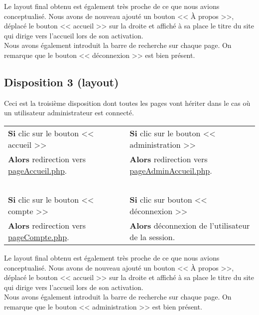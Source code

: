 
        \begin{paragraphe}
            Le layout final obtenu est également très proche de ce que nous avions conceptualisé. Nous avons de nouveau ajouté un bouton << À propos >>,
            déplacé le bouton << accueil >> sur la droite et affiché à sa place le titre du site qui dirige vers l'accueil lors de son activation.\\
            Nous avons également introduit la barre de recherche sur chaque page. On remarque que le bouton << déconnexion >> est bien présent.
        \end{paragraphe}


	\newpage

	\subsection{Disposition 3 (layout)}

		\begin{paragraphe}
            Ceci est la troisième disposition dont toutes les pages vont hériter dans le cas où un utilisateur administrateur est connecté.
		\end{paragraphe}

        \begin{center}
            \begin{tabular}{l c | c l}
                \textbf{Si} clic sur le bouton << accueil >> & & & \textbf{Si} clic sur le bouton << administration >> \\
                \textbf{Alors} redirection vers \underline{pageAccueil.php}. & & & \textbf{Alors} redirection vers \underline{pageAdminAccueil.php}. \\ \\
                \textbf{Si} clic sur le bouton << compte >> & & & \textbf{Si} clic sur bouton << déconnexion >> \\
                \textbf{Alors} redirection vers \underline{pageCompte.php}. & & & \textbf{Alors} déconnexion de l'utilisateur de la session.
            \end{tabular}
        \end{center}


        \begin{paragraphe}
            Le layout final obtenu est également très proche de ce que nous avions conceptualisé. Nous avons de nouveau ajouté un bouton << À propos >>,
            déplacé le bouton << accueil >> sur la droite et affiché à sa place le titre du site qui dirige vers l'accueil lors de son activation.\\
            Nous avons également introduit la barre de recherche sur chaque page. On remarque que le bouton << administration >> est bien présent.
        \end{paragraphe}

